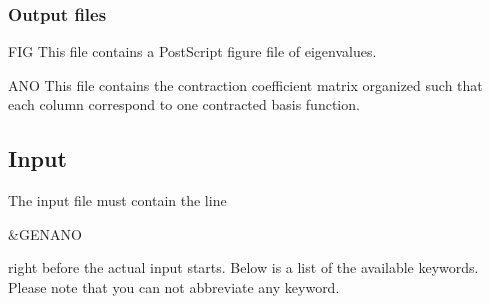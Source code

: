 \subsubsection{Output files}

\begin{filelist}
\item[FIG]
This file contains a PostScript figure file of eigenvalues.
\item[ANO]
This file contains the contraction coefficient matrix organized
such that each column correspond to one contracted basis function.
\end{filelist}

\subsection{Input}
\label{UG:sec:genano_input}

The input file must contain the line
\begin{inputlisting}
 &GENANO
\end{inputlisting}
right before the actual input starts. Below is a list of the available keywords.
Please note that you can not abbreviate any keyword.

